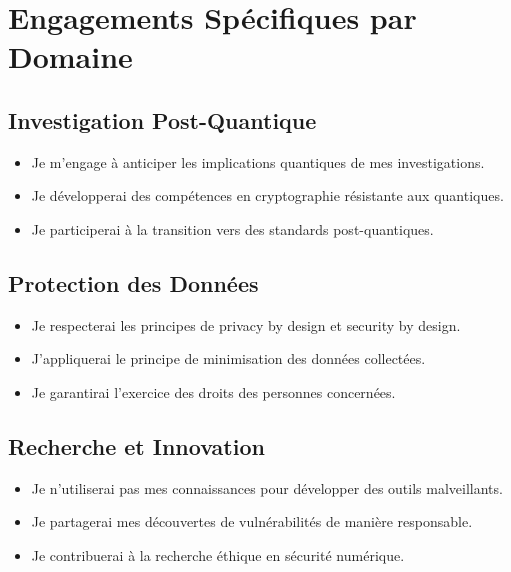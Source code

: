 \documentclass[11pt,a4paper,oneside]{book}
\begin{document}
        \section*{Engagements Spécifiques par Domaine}
            \subsection*{Investigation Post-Quantique}
                \begin{itemize}
                    \item Je m'engage à anticiper les implications quantiques de mes investigations.
                    \item Je développerai des compétences en cryptographie résistante aux quantiques.
                    \item Je participerai à la transition vers des standards post-quantiques.
                \end{itemize}

            \subsection*{Protection des Données}
                \begin{itemize}
                    \item Je respecterai les principes de privacy by design et security by design.
                    \item J'appliquerai le principe de minimisation des données collectées.
                    \item Je garantirai l'exercice des droits des personnes concernées.
                \end{itemize}

            \subsection*{Recherche et Innovation}
                \begin{itemize}
                    \item Je n'utiliserai pas mes connaissances pour développer des outils malveillants.
                    \item Je partagerai mes découvertes de vulnérabilités de manière responsable.
                    \item Je contribuerai à la recherche éthique en sécurité numérique.                       
                \end{itemize}
\end{document}
